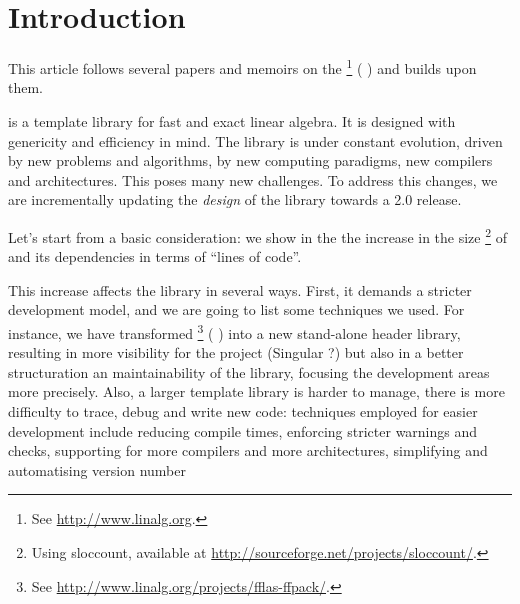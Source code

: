 \section{Introduction}
%
This article follows several papers and memoirs on the \linbox%
%
\footnote{See \url{http://www.linalg.org}.}
%
(\cf{} \cite{Giorgi:2004:these,Turner:2002:these,Boyer:2012:these,Dumas:2002:icms,Dumas:2010:lbpar})
and builds upon them.

\linbox is a \cpp template library for fast and exact linear algebra. It is designed with genericity
and efficiency in mind.
%
%
The \linbox library is under constant evolution, driven by new problems and
algorithms, by new computing paradigms, new compilers and architectures. This
poses many new challenges. To address this changes, we are incrementally
updating the \emph{design} of the library towards a \textsf{2.0} release.
%
\par
%
Let's start from a basic consideration: we show in the  the
increase in the size%
%
\footnote{Using \textsf{sloccount}, available at
\url{http://sourceforge.net/projects/sloccount/}.}
%
of \linbox and its dependencies in terms of ``lines of code''.
%
%

%
This increase affects the library in several ways.  First, it demands a
stricter development model, and we are going to list some techniques we used.
For instance, we have transformed \fflasffpack %
%
\footnote{See \url{http://www.linalg.org/projects/fflas-ffpack/}.}
(\cf{} \cite{Dumas:2008:Flas}) into a new stand-alone header library, resulting
in more visibility for the \fflasffpack project (Singular ?) but also in a better
structuration an maintainability of the library, focusing the development
areas more precisely.
%
%
Also, a larger template library is harder to manage, there is more difficulty
to trace, debug and write new code: techniques employed
for easier development include reducing
compile times, enforcing stricter warnings and checks, supporting for more
compilers and more architectures, simplifying and automatising version number
